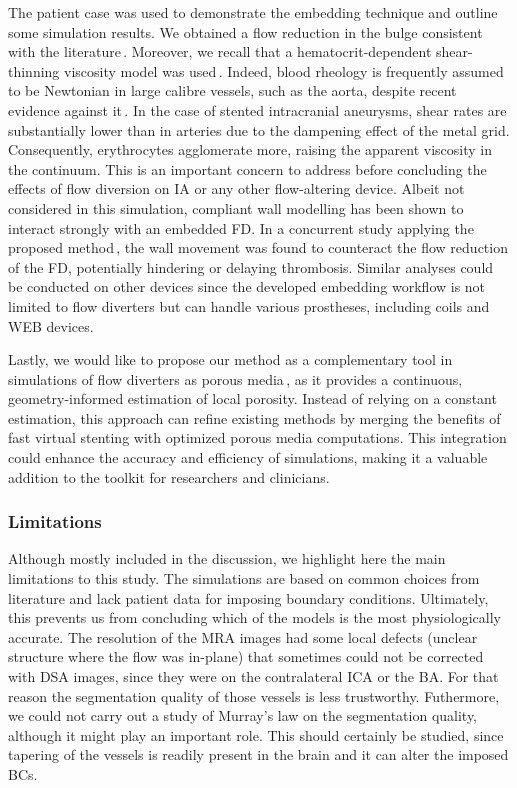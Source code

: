 The patient case was used to demonstrate the embedding technique and outline some simulation results. We obtained a flow reduction in the bulge consistent with the literature\,\cite{Suzuki999, Sindeev2018}. Moreover, we recall that a hematocrit-dependent shear-thinning viscosity model was used\,\cite{Suzuki2021}. Indeed, blood rheology is frequently assumed to be Newtonian in large calibre vessels, such as the aorta, despite recent evidence against it\,\cite{Lynch2022}. In the case of stented intracranial aneurysms, shear rates are substantially lower than in arteries due to the dampening effect of the metal grid. Consequently, erythrocytes agglomerate more, raising the apparent viscosity in the continuum. This is an important concern to address before concluding the effects of flow diversion on IA or any other flow-altering device. Albeit not considered in this simulation, compliant wall modelling has been shown to interact strongly with an embedded FD\@. In a concurrent study applying the proposed method\,\cite{Goetz2024}, the wall movement was found to counteract the flow reduction of the FD, potentially hindering or delaying thrombosis. Similar analyses could be conducted on other devices since the developed embedding workflow is not limited to flow diverters but can handle various prostheses, including coils and WEB devices.

Lastly, we would like to propose our method as a complementary tool in simulations of flow diverters as porous media\,\cite{Augsburger2011, Abdehkakha2021}, as it provides a continuous, geometry-informed estimation of local porosity. Instead of relying on a constant estimation, this approach can refine existing methods by merging the benefits of fast virtual stenting with optimized porous media computations. This integration could enhance the accuracy and efficiency of simulations, making it a valuable addition to the toolkit for researchers and clinicians.

\subsubsection*{Limitations}
Although mostly included in the discussion, we highlight here the main limitations to this study. The simulations are based on common choices from literature and lack patient data for imposing boundary conditions. Ultimately, this prevents us from concluding which of the models is the most physiologically accurate. The resolution of the MRA images had some local defects (unclear structure where the flow was in-plane) that sometimes could not be corrected with DSA images, since they were on the contralateral ICA or the BA\@. For that reason the segmentation quality of those vessels is less trustworthy. Futhermore, we could not carry out a study of Murray's law on the segmentation quality, although it might play an important role. This should certainly be studied, since tapering of the vessels is readily present in the brain and it can alter the imposed BCs.\\
\vspace*{1cm}

